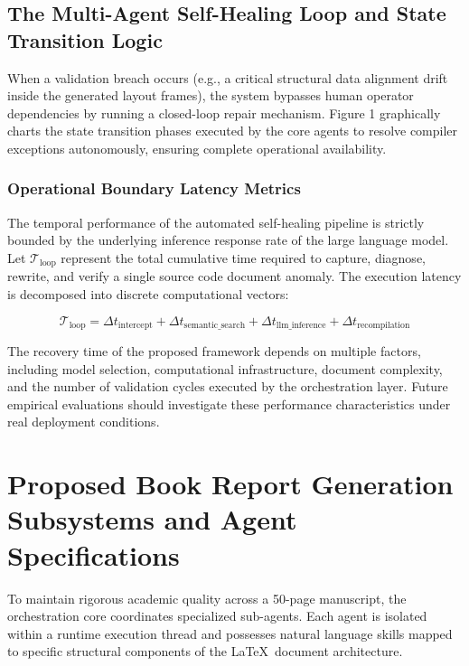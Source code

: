 \subsection{The Multi-Agent Self-Healing Loop and State Transition Logic}
When a validation breach occurs (e.g., a critical structural data alignment drift inside the generated layout frames), the system bypasses human operator dependencies by running a closed-loop repair mechanism. Figure 1 graphically charts the state transition phases executed by the core agents to resolve compiler exceptions autonomously, ensuring complete operational availability.

\subsubsection{Operational Boundary Latency Metrics}
The temporal performance of the automated self-healing pipeline is strictly bounded by the underlying inference response rate of the large language model. Let \(\mathcal{T}_{\text{loop}}\) represent the total cumulative time required to capture, diagnose, rewrite, and verify a single source code document anomaly. The execution latency is decomposed into discrete computational vectors:

\begin{equation}
\mathcal{T}_{\text{loop}} = \Delta t_{\text{intercept}} + \Delta t_{\text{semantic\_search}} + \Delta t_{\text{llm\_inference}} + \Delta t_{\text{recompilation}}
\end{equation}

The recovery time of the proposed framework depends on multiple factors, including model selection, computational infrastructure, document complexity, and the number of validation cycles executed by the orchestration layer. Future empirical evaluations should investigate these performance characteristics under real deployment conditions.

\section{Proposed Book Report Generation Subsystems and Agent Specifications}
To maintain rigorous academic quality across a 50-page manuscript, the orchestration core coordinates specialized sub-agents. Each agent is isolated within a runtime execution thread and possesses natural language skills mapped to specific structural components of the \LaTeX\ document architecture.

